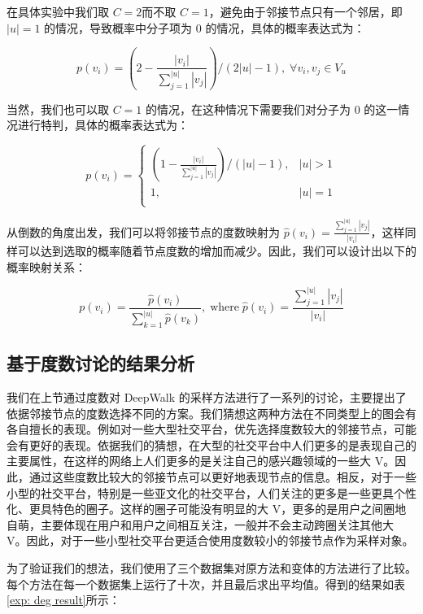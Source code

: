 \documentclass{ctexart}
\begin{document}
在具体实验中我们取 \(C = 2\)而不取 \(C = 1\)，避免由于邻接节点只有一个邻居，即 \(|u| = 1\) 的情况，导致概率中分子项为 0 的情况，具体的概率表达式为：

\begin{equation}
    p(v_i) = \left(2 - \frac{|v_i|}{\sum_{j=1}^{|u|} |v_j|}\right) / \left(2|u| - 1\right), \;\forall v_i, v_j \in V_u 
\end{equation}

当然，我们也可以取 \(C = 1\) 的情况，在这种情况下需要我们对分子为 0 的这一情况进行特判，具体的概率表达式为：

\begin{equation}
p(v_i) = \begin{cases}
    \left ( 1 - \frac{|v_i|}{\sum_{j=1}^{|u|} |v_j|} \right ) / (|u| - 1),& |u| > 1 \\
    1,& |u| = 1 \\
\end{cases}
\end{equation}

从倒数的角度出发，我们可以将邻接节点的度数映射为 \(\hat{p}(v_i) = \frac{\sum_{j=1}^{|u|} |v_j|}{|v_i|}\)，这样同样可以达到选取的概率随着节点度数的增加而减少。因此，我们可以设计出以下的概率映射关系：

\begin{equation}
p(v_i) = \frac{\hat{p}(v_i)}{\sum_{k=1}^{|u|} \hat{p}(v_k)}, \;\text{where} \;\hat{p}(v_i) = \frac{\sum_{j=1}^{|u|} |v_j|}{|v_i|}
\end{equation}

\subsection{基于度数讨论的结果分析}

我们在上节通过度数对 DeepWalk 的采样方法进行了一系列的讨论，主要提出了依据邻接节点的度数选择不同的方案。我们猜想这两种方法在不同类型上的图会有各自擅长的表现。例如对一些大型社交平台，优先选择度数较大的邻接节点，可能会有更好的表现。依据我们的猜想，在大型的社交平台中人们更多的是表现自己的主要属性，在这样的网络上人们更多的是关注自己的感兴趣领域的一些大 V。因此，通过这些度数比较大的邻接节点可以更好地表现节点的信息。相反，对于一些小型的社交平台，特别是一些亚文化的社交平台，人们关注的更多是一些更具个性化、更具特色的圈子。这样的圈子可能没有明显的大 V，更多的是用户之间圈地自萌，主要体现在用户和用户之间相互关注，一般并不会主动跨圈关注其他大 V。因此，对于一些小型社交平台更适合使用度数较小的邻接节点作为采样对象。

为了验证我们的想法，我们使用了三个数据集对原方法和变体的方法进行了比较。每个方法在每一个数据集上运行了十次，并且最后求出平均值。得到的结果如表 \ref{exp: deg result}所示：
\end{document}
